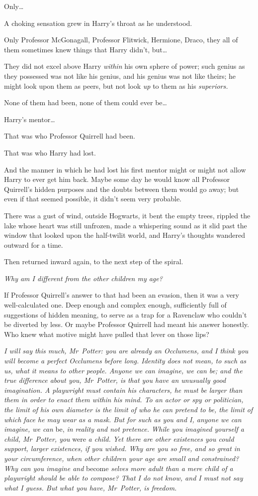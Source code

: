 Only…

A choking sensation grew in Harry’s throat as he understood.

Only Professor McGonagall, Professor Flitwick, Hermione, Draco, they all of them sometimes knew things that Harry didn’t, but…

They did not excel above Harry \emph{within} his own sphere of power; such genius as they possessed was not like his genius, and his genius was not like theirs; he might look upon them as peers, but not look \emph{up} to them as his \emph{superiors.}

None of them had been, none of them could ever be…

Harry’s mentor…

That was who Professor Quirrell had been.

That was who Harry had lost.

And the manner in which he had lost his first mentor might or might not allow Harry to ever get him back. Maybe some day he would know all Professor Quirrell’s hidden purposes and the doubts between them would go away; but even if that seemed possible, it didn’t seem very probable.

There was a gust of wind, outside Hogwarts, it bent the empty trees, rippled the lake whose heart was still unfrozen, made a whispering sound as it slid past the window that looked upon the half-twilit world, and Harry’s thoughts wandered outward for a time.

Then returned inward again, to the next step of the spiral.

\emph{Why am I different from the other children my age?}

If Professor Quirrell’s answer to that had been an evasion, then it was a very well-calculated one. Deep enough and complex enough, sufficiently full of suggestions of hidden meaning, to serve as a trap for a Ravenclaw who couldn’t be diverted by less. Or maybe Professor Quirrell had meant his answer honestly. Who knew what motive might have pulled that lever on those lips?

\emph{I will say this much, Mr~Potter: you are already an Occlumens, and I think you will become a perfect Occlumens before long. Identity does not mean, to such as us, what it means to other people. Anyone we can imagine, we can be; and the true difference about you, Mr~Potter, is that you have an unusually good imagination. A playwright must contain his characters, he must be larger than them in order to enact them within his mind. To an actor or spy or politician, the limit of his own diameter is the limit of who he can pretend to be, the limit of which face he may wear as a mask. But for such as you and I, anyone we can imagine, we can} be, \emph{in reality and not pretence. While you imagined yourself a child, Mr~Potter, you} were \emph{a child. Yet there are other existences you could support, larger existences, if you wished. Why are you so free, and so great in your circumference, when other children your age are small and constrained? Why can you imagine and} become \emph{selves more adult than a mere child of a playwright should be able to compose? That I do not know, and I must not say what I guess. But what you have, Mr~Potter, is freedom.}

